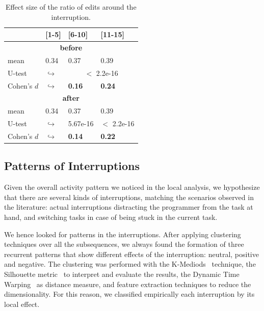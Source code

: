 \documentclass[times]{smrauth}
\begin{document}
\begin{table}[ht!]
\tiny
\renewcommand{\arraystretch}{1.3}
\caption{Effect size of the ratio of edits around the interruption.}
\label{tbl:ratio_all}
\centering
\begin{tabular}{l | p{0.7cm} | p{1.9cm} | p{1.9cm} } 
   & [1-5] & [6-10] & [11-15] \\  
  \hline
  \multicolumn{4}{c}{\textbf{before}} \\
  \hline
  mean & 0.34 &	0.37 &	0.39 \\ 
   \cline{3-4} 
  U-test & $\hookrightarrow$ & \multicolumn{2}{c}{$<$ 2.2e-16}  \\

  \cline{3-4} 
  Cohen's $d$ & $\hookrightarrow$	& \textbf{0.16} & \textbf{0.24}   \\
  \hline
  
  
  \multicolumn{4}{c}{\textbf{after}} \\
  \hline 
  mean & 0.34 &	0.37 &	0.39 \\ 
   \cline{3-4} 
  U-test & $\hookrightarrow$ & 5.67e-16 & $<$ 2.2e-16 \\  
  \cline{3-4} 
  Cohen's $d$ & $\hookrightarrow$	& \textbf{0.14} & \textbf{0.22}  \\  
\end{tabular}
\end{table}

\subsection{Patterns of Interruptions}
Given the overall activity pattern we noticed in the local analysis, we hypothesize that there are several kinds of interruptions, matching the scenarios observed in the literature: actual interruptions distracting the programmer from the task at hand, and switching tasks in case of being stuck in the current task.

We hence looked for patterns in the interruptions.  After applying clustering techniques over all the subsequences, we always found the formation of three recurrent patterns that show different effects of the interruption: neutral, positive and negative. The clustering was performed with the  K-Mediods~\cite{AMP97} technique, the Silhouette metric~\cite{RP87} to interpret and evaluate the results, the Dynamic Time Warping~\cite{KE05} as distance measure, and feature extraction techniques to reduce the dimensionality.  For this reason, we classified empirically each interruption by its local effect. 
\end{document}
